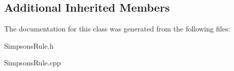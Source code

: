 \subsection*{Additional Inherited Members}


The documentation for this class was generated from the following files\+:\begin{DoxyCompactItemize}
\item 
Simpsons\+Rule.\+h\item 
Simpsons\+Rule.\+cpp\end{DoxyCompactItemize}
